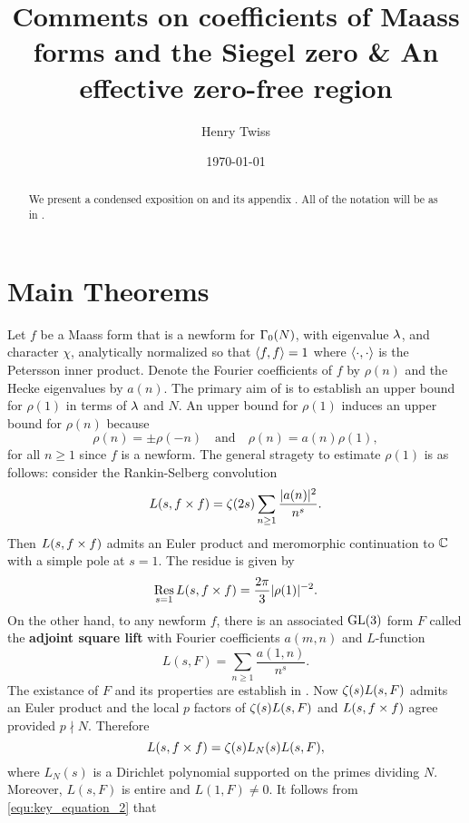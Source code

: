 \documentclass[12pt,reqno,oneside]{amsart}
\title{Comments on coefficients of Maass forms
and the Siegel zero \& An effective zero-free region}
\author{Henry Twiss}
\date{\today}
\begin{document}
\begin{abstract}
    We present a condensed exposition on \cite{HL} and its appendix \cite{GHL}. All of the notation will be as in \cite{HL}.
\end{abstract}

\maketitle

\section{Main Theorems}
    Let $f$ be a Maass form that is a newform for $\Gamma_{0}(N)$, with eigenvalue $\lambda$, and character $\chi$, analytically normalized so that $\langle f,f\rangle = 1$ where $\langle\cdot,\cdot\rangle$ is the Petersson inner product. Denote the Fourier coefficients of $f$ by $\rho(n)$ and the Hecke eigenvalues by $a(n)$. The primary aim of \cite{HL} is to establish an upper bound for $\rho(1)$ in terms of $\lambda$ and $N$. An upper bound for $\rho(1)$ induces an upper bound for $\rho(n)$ because
    \[
        \rho(n) = \pm\rho(-n) \quad \text{and} \quad \rho(n) = a(n)\rho(1),
    \]
    for all $n \ge 1$ since $f$ is a newform. The general stragety to estimate $\rho(1)$ is as follows: consider the Rankin-Selberg convolution
    \[
        L(s,f \times f) = \zeta(2s)\sum_{n \ge 1}\frac{|a(n)|^{2}}{n^{s}}.
    \]
    Then $L(s,f \times f)$ admits an Euler product and meromorphic continuation to $\mathbb{C}$ with a simple pole at $s = 1$. The residue is given by
    \begin{equation}\label{equ:key_equation_1}
        \operatorname*{\mathrm{Res}}_{s = 1}L(s,f \times f) = \frac{2\pi}{3}|\rho(1)|^{-2}.
    \end{equation}
    On the other hand, to any newform $f$, there is an associated $\mathrm{GL}(3)$ form $F$ called the \textbf{adjoint square lift} with Fourier coefficients $a(m,n)$ and $L$-function
    \[
        L(s,F) = \sum_{n \ge 1}\frac{a(1,n)}{n^{s}}.
    \]
    The existance of $F$ and its properties are establish in \cite{GJ}. Now $\zeta(s)L(s,F)$ admits an Euler product and the local $p$ factors of $\zeta(s)L(s,F)$ and $L(s,f \times f)$ agree provided $p \nmid N$. Therefore
    \begin{equation}\label{equ:key_equation_2}
        L(s,f \times f) = \zeta(s)L_{N}(s)L(s,F),
    \end{equation}
    where $L_{N}(s)$ is a Dirichlet polynomial supported on the primes dividing $N$. Moreover, $L(s,F)$ is entire and $L(1,F) \neq 0$. It follows from \cref{equ:key_equation_2} that
\end{document}

